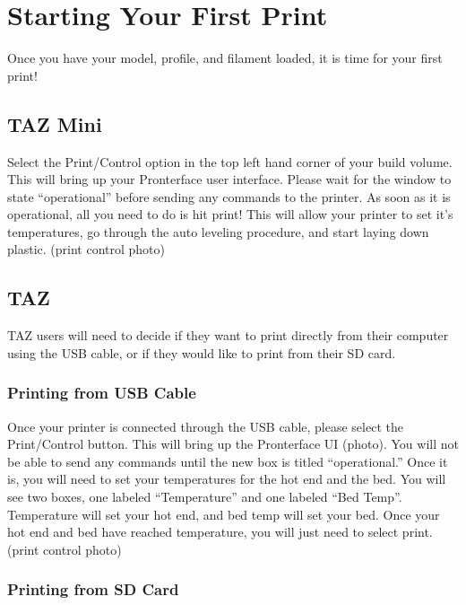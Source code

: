 \section{Starting Your First Print}

Once you have your model, profile, and filament loaded, it is time for your first print! 

\subsection{TAZ Mini}

Select the Print/Control option in the top left hand corner of your build volume. This will bring up your Pronterface user interface. Please wait for the window to state “operational” before sending any commands to the printer. As soon as it is operational, all you need to do is hit print! This will allow your printer to set it's temperatures, go through the auto leveling procedure, and start laying down plastic. (print control photo)

\subsection{TAZ}

TAZ users will need to decide if they want to print directly from their computer using the USB cable, or if they would like to print from their SD card. 

\subsubsection{Printing from USB Cable}

Once your printer is connected through the USB cable, please select the Print/Control button. This will bring up the Pronterface UI (photo). You will not be able to send any commands until the new box is titled “operational.” Once it is, you will need to set your temperatures for the hot end and the bed. You will see two boxes, one labeled “Temperature” and one labeled “Bed Temp”. Temperature will set your hot end, and bed temp will set your bed. Once your hot end and bed have reached temperature, you will just need to select print. (print control photo)

\subsubsection{Printing from SD Card}


